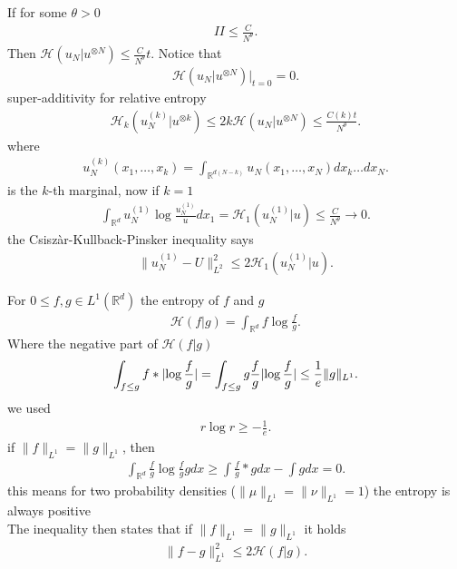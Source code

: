 If  for some $\theta  > 0$
\begin{align*}
  II \le   \frac{C}{N^{\theta } }
.\end{align*}
Then  $\mathcal{H}(u_N | u^{\otimes N} ) \le \frac{C}{N^{\theta } } t $. Notice that 
\begin{align*}
  \mathcal{H}(u_N | u^{\otimes N} )\rvert_{t=0}  = 0
.\end{align*}
super-additivity for relative entropy
\begin{align*}
  \mathcal{H}_k (u^{(k)}_N | u^{\otimes k}  ) \le  2k \mathcal{H}(u_N | u^{\otimes N} ) \le \frac{C(k)t}{N^{\theta } }
.\end{align*}
where 
\begin{align*}
  u_N^{(k)}(x_{1},\ldots ,x_k)= \int_{\mathbb{R}^{d(N-k)} }u_N(x_{1},\ldots ,x_N) dx_{k}\ldots dx_N
.\end{align*}
is the $k$-th marginal, now if $k=1$ 
\begin{align*}
  \int_{\mathbb{R}^{d} } u_N^{(1)}  \log \frac{u_N^{(1)} }{u} dx_{1} = \mathcal{H}_1(u_N^{(1)} | u ) \le  \frac{C}{N^{\theta } } \to 0
.\end{align*}
the Csisz\`ar-Kullback-Pinsker inequality says
\begin{align*}
  \|u_N^{(1)}-U \|_{L^2}^{2} \le  2 \mathcal{H}_1(u_{N}^{(1)} | u ) 
.\end{align*}
\begin{lemma}
 For $0\le f,g \in  L^{1}(\mathbb{R}^{d} ) $ the entropy of $f$ and $g$ 
 \begin{align*}
   \mathcal{H}(f | g) = \int_{\mathbb{R}^{d} } f \log \frac{f}{g}
 .\end{align*}
 Where the negative part of $\mathcal{H}(f|g)$
 \begin{align*}
   \int_{f \le g} f * \lvert\log \frac{f}{g}\rvert =  \int_{f \le  g} g \frac{f}{g} \lvert\log  \frac{f}{g}\rvert \le  \frac{1}{e} \|g\|_{L^{1} }
 .\end{align*}
 we used 
 \begin{align*}
  r \log  r \ge  -\frac{1}{e}
 .\end{align*}
 if $\|f\|_{L^{1}} = \|g\|_{L^{1} } $, then
 \begin{align*}
   \int_{\mathbb{R}^{d} } \frac{f}{g} \log  \frac{f}{g} g dx \ge \int  \frac{f}{g} * g dx - \int g dx = 0
 .\end{align*}
 this means for two probability densities ($\|\mu \|_{L^{1} }=\|\nu \|_{L^{1} } = 1$) the entropy is always positive\\[1ex]
 The inequality then states that if $\|f\|_{L^{1} } = \|g\|_{L^{1} }$ it holds 
 \begin{align*}
   \|f-g\|_{L^{1} }^2 \le 2 \mathcal{H}(f | g)
 .\end{align*}
\end{lemma}
